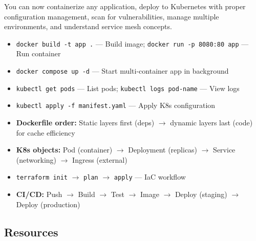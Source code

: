 \documentclass[11pt, a4paper, oneside]{report}
\begin{document}
\begin{microcheckpoint}
You can now containerize any application, deploy to Kubernetes with proper configuration management, scan for vulnerabilities, manage multiple environments, and understand service mesh concepts.
\end{microcheckpoint}

\begin{cheatsheetbox}
\begin{itemize}[leftmargin=*]
\item \texttt{docker build -t app .} --- Build image; \texttt{docker run -p 8080:80 app} --- Run container
\item \texttt{docker compose up -d} --- Start multi-container app in background
\item \texttt{kubectl get pods} --- List pods; \texttt{kubectl logs pod-name} --- View logs
\item \texttt{kubectl apply -f manifest.yaml} --- Apply K8s configuration
\item \textbf{Dockerfile order:} Static layers first (deps) $\to$ dynamic layers last (code) for cache efficiency
\item \textbf{K8s objects:} Pod (container) $\to$ Deployment (replicas) $\to$ Service (networking) $\to$ Ingress (external)
\item \texttt{terraform init} $\to$ \texttt{plan} $\to$ \texttt{apply} --- IaC workflow
\item \textbf{CI/CD:} Push $\to$ Build $\to$ Test $\to$ Image $\to$ Deploy (staging) $\to$ Deploy (production)
\end{itemize}
\end{cheatsheetbox}


\subsection*{Resources}
\end{document}
